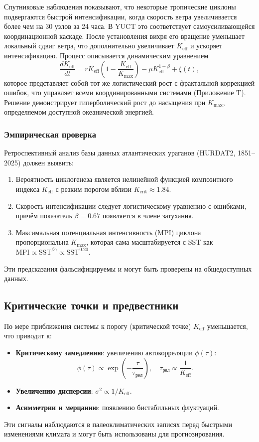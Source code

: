 \documentclass[12pt,a4paper]{article}
\newcommand{\Keff}{K_{\mathrm{eff}}}
\begin{document}
	Спутниковые наблюдения показывают, что некоторые тропические циклоны подвергаются быстрой интенсификации, когда скорость ветра увеличивается более чем на 30 узлов за 24 часа. В YUCT это соответствует самоусиливающейся координационной каскаде. После установления вихря его вращение уменьшает локальный сдвиг ветра, что дополнительно увеличивает $\Keff$ и ускоряет интенсификацию. Процесс описывается динамическим уравнением
	\[
	\frac{d\Keff}{dt} = r \Keff \left( 1 - \frac{\Keff}{K_{\max}} \right)
	- \mu \Keff^{1-\beta} + \xi(t),
	\]
	которое представляет собой тот же логистический рост с фрактальной коррекцией ошибок, что управляет всеми координированными системами (Приложение T). Решение демонстрирует гиперболический рост до насыщения при $K_{\max}$, определяемом доступной океанической энергией.
	
	\subsubsection*{Эмпирическая проверка}
	
	Ретроспективный анализ базы данных атлантических ураганов (HURDAT2, 1851–2025) должен выявить:
	\begin{enumerate}
		\item Вероятность циклогенеза является нелинейной функцией композитного индекса $\Keff$ с резким порогом вблизи $K_{\mathrm{crit}} \approx 1.84$.
		\item Скорость интенсификации следует логистическому уравнению с ошибками, причём показатель $\beta = 0.67$ появляется в члене затухания.
		\item Максимальная потенциальная интенсивность (MPI) циклона пропорциональна $K_{\mathrm{max}}$, которая сама масштабируется с SST как $\mathrm{MPI} \propto \mathrm{SST}^{\beta\gamma} \propto \mathrm{SST}^{0.20}$.
	\end{enumerate}
	Эти предсказания фальсифицируемы и могут быть проверены на общедоступных данных.
	
	\subsection{Критические точки и предвестники}
	
	По мере приближения системы к порогу (критической точке) \(\Keff\) уменьшается, что приводит к:
	\begin{itemize}
		\item \textbf{Критическому замедлению}: увеличению автокорреляции \(\phi(\tau)\):
		\[
		\phi(\tau) \propto \exp\!\left(-\frac{\tau}{\tau_{\text{рел}}}\right),\quad \tau_{\text{рел}} \propto \frac{1}{\Keff}.
		\]
		\item \textbf{Увеличению дисперсии}: \(\sigma^2 \propto 1/\Keff\).
		\item \textbf{Асимметрии и мерцанию}: появлению бистабильных флуктуаций.
	\end{itemize}
	Эти сигналы наблюдаются в палеоклиматических записях перед быстрыми изменениями климата и могут быть использованы для прогнозирования.
	
\end{document}
